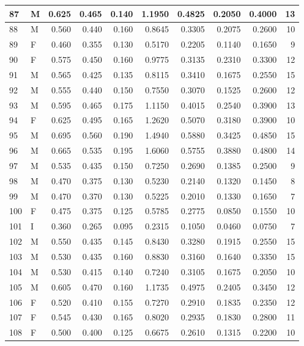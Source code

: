 \documentclass[9pt,twocolumn,twoside,]{pnas-new}
\begin{document}
\begin{tabular}{l|l|r|r|r|r|r|r|r|r}
\hline
87 & M & 0.625 & 0.465 & 0.140 & 1.1950 & 0.4825 & 0.2050 & 0.4000 & 13\\
\hline
88 & M & 0.560 & 0.440 & 0.160 & 0.8645 & 0.3305 & 0.2075 & 0.2600 & 10\\
\hline
89 & F & 0.460 & 0.355 & 0.130 & 0.5170 & 0.2205 & 0.1140 & 0.1650 & 9\\
\hline
90 & F & 0.575 & 0.450 & 0.160 & 0.9775 & 0.3135 & 0.2310 & 0.3300 & 12\\
\hline
91 & M & 0.565 & 0.425 & 0.135 & 0.8115 & 0.3410 & 0.1675 & 0.2550 & 15\\
\hline
92 & M & 0.555 & 0.440 & 0.150 & 0.7550 & 0.3070 & 0.1525 & 0.2600 & 12\\
\hline
93 & M & 0.595 & 0.465 & 0.175 & 1.1150 & 0.4015 & 0.2540 & 0.3900 & 13\\
\hline
94 & F & 0.625 & 0.495 & 0.165 & 1.2620 & 0.5070 & 0.3180 & 0.3900 & 10\\
\hline
95 & M & 0.695 & 0.560 & 0.190 & 1.4940 & 0.5880 & 0.3425 & 0.4850 & 15\\
\hline
96 & M & 0.665 & 0.535 & 0.195 & 1.6060 & 0.5755 & 0.3880 & 0.4800 & 14\\
\hline
97 & M & 0.535 & 0.435 & 0.150 & 0.7250 & 0.2690 & 0.1385 & 0.2500 & 9\\
\hline
98 & M & 0.470 & 0.375 & 0.130 & 0.5230 & 0.2140 & 0.1320 & 0.1450 & 8\\
\hline
99 & M & 0.470 & 0.370 & 0.130 & 0.5225 & 0.2010 & 0.1330 & 0.1650 & 7\\
\hline
100 & F & 0.475 & 0.375 & 0.125 & 0.5785 & 0.2775 & 0.0850 & 0.1550 & 10\\
\hline
101 & I & 0.360 & 0.265 & 0.095 & 0.2315 & 0.1050 & 0.0460 & 0.0750 & 7\\
\hline
102 & M & 0.550 & 0.435 & 0.145 & 0.8430 & 0.3280 & 0.1915 & 0.2550 & 15\\
\hline
103 & M & 0.530 & 0.435 & 0.160 & 0.8830 & 0.3160 & 0.1640 & 0.3350 & 15\\
\hline
104 & M & 0.530 & 0.415 & 0.140 & 0.7240 & 0.3105 & 0.1675 & 0.2050 & 10\\
\hline
105 & M & 0.605 & 0.470 & 0.160 & 1.1735 & 0.4975 & 0.2405 & 0.3450 & 12\\
\hline
106 & F & 0.520 & 0.410 & 0.155 & 0.7270 & 0.2910 & 0.1835 & 0.2350 & 12\\
\hline
107 & F & 0.545 & 0.430 & 0.165 & 0.8020 & 0.2935 & 0.1830 & 0.2800 & 11\\
\hline
108 & F & 0.500 & 0.400 & 0.125 & 0.6675 & 0.2610 & 0.1315 & 0.2200 & 10\\

\end{tabular}
\end{document}
